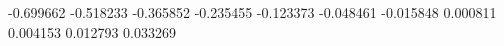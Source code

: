 -0.699662
-0.518233
-0.365852
-0.235455
-0.123373
-0.048461
-0.015848
0.000811
0.004153
0.012793
0.033269
